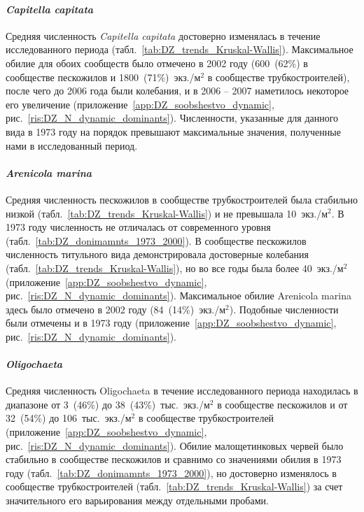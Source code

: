 \paragraph{\textit{Capitella capitata}}
Средняя численность {\it Capitella capitata} достоверно изменялась в течение исследованного периода (табл.~\ref{tab:DZ_trends_Kruskal-Wallis}). 
Максимальное обилие для обоих сообществ было отмечено в 2002 году (600~(62\%) в сообществе пескожилов и 1800~(71\%)~экз./м$^2$ в сообществе трубкостроителей), после чего до 2006 года были колебания, и в 2006 -- 2007 наметилось некоторое его увеличение (приложение~\ref{app:DZ_soobshestvo_dynamic}, рис.~\ref{ris:DZ_N_dynamic_dominants}). 
Численности, указанные для данного вида в 1973 году на порядок превышают  максимальные значения, полученные нами в исследованный период.

\paragraph{\textit{Arenicola marina}}
Средняя численность пескожилов в сообществе трубкостроителей была стабильно низкой (табл.~\ref{tab:DZ_trends_Kruskal-Wallis}) и не превышала 10~экз./м$^2$. 
В 1973 году численность не отличалась от современного уровня (табл.~\ref{tab:DZ_donimamnts_1973_2000}). 
В сообществе пескожилов численность титульного вида демонстрировала достоверные колебания (табл.~\ref{tab:DZ_trends_Kruskal-Wallis}), но во все годы была более 40~экз./м$^2$ (приложение~\ref{app:DZ_soobshestvo_dynamic}, рис.~\ref{ris:DZ_N_dynamic_dominants}). 
Максимальное обилие Arenicola marina здесь было отмечено в 2002 году (84~(14\%)~экз./м$^2$). 
Подобные численности были отмечены и в 1973 году (приложение~\ref{app:DZ_soobshestvo_dynamic}, рис.~\ref{ris:DZ_N_dynamic_dominants}).

\paragraph{\textit{Oligochaeta}}
Средняя численность Oligochaeta в течение исследованного периода находилась в диапазоне от 3~(46\%) до 38~(43\%)~тыс.~экз./м$^2$ в сообществе пескожилов и от 32~(54\%) до 106~тыс.~экз./м$^2$ в сообществе трубкостроителей (приложение~\ref{app:DZ_soobshestvo_dynamic}, рис.~\ref{ris:DZ_N_dynamic_dominants}). 
Обилие малощетинковых червей было стабильно в сообществе пескожилов и сравнимо со значениями обилия в 1973 году (табл.~\ref{tab:DZ_donimamnts_1973_2000}), но достоверно изменялось в сообществе трубкостроителей (табл.~\ref{tab:DZ_trends_Kruskal-Wallis}) за счет значительного его варьирования между отдельными пробами.

